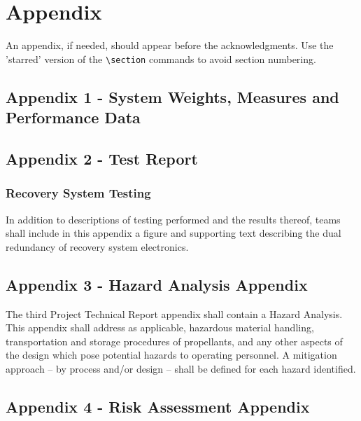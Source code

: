 \documentclass[]{aiaa-tc}%
\begin{document}
\clearpage
\section*{Appendix}



An appendix, if needed, should appear before the acknowledgments.
Use the 'starred' version of the \verb|\section| commands to avoid
section numbering.
\clearpage

\subsection*{Appendix 1 - System Weights, Measures and Performance Data}


\clearpage
\subsection*{Appendix 2 - Test Report}


\subsubsection{Recovery System Testing}

 In addition to descriptions of testing performed and the results thereof, teams shall include in this appendix a figure and supporting text describing the dual redundancy of recovery system electronics.

\clearpage
\subsection*{Appendix 3 - Hazard Analysis Appendix}


The third Project Technical Report appendix shall contain a Hazard Analysis. This appendix shall address as applicable, hazardous material handling, transportation and storage procedures of propellants, and any other aspects of the design which pose potential hazards to operating personnel. A mitigation approach – by process and/or design – shall be defined for each hazard identified.

\clearpage
\subsection*{Appendix 4 - Risk Assessment Appendix}
\end{document}
